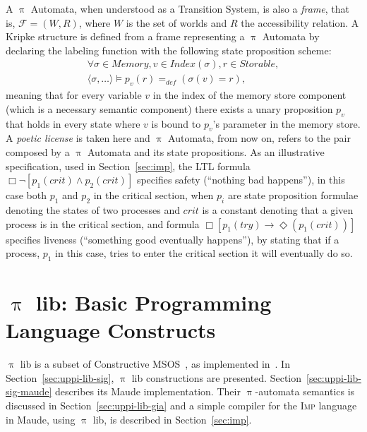\documentclass[a4paper,openany]{book}
\begin{document}
A $\uppi$ Automata, when understood as a Transition System, is also a \emph{frame}, that is, $\mathcal{F} = (W, R)$, where $W$ is the set of worlds and $R$ the accessibility relation. A Kripke structure is defined from a frame representing a $\uppi$ Automata by declaring the labeling function with the following state proposition scheme:
\begin{eqnarray}
\forall \sigma \in \mathit{Memory}, v \in \mathit{Index}(\sigma), r \in \mathit{Storable}, \nonumber\\
\langle \sigma, \ldots \rangle \models p_v(r) =_{\mathit{def}} (\sigma(v) = r),
\end{eqnarray}
meaning that for every variable $v$ in the index of the memory store component (which is a necessary semantic component) there exists a unary proposition $p_v$ that holds in every state where $v$ is bound to $p_v$'s parameter in the memory store.  A \emph{poetic license} is taken here and $\uppi$ Automata, from now on, refers to the pair composed by a $\uppi$ Automata and its state propositions.
As an illustrative specification, used in Section~\ref{sec:imp}, the LTL formula $\Box \neg[p_1(\mathit{crit}) \land p_2(\mathit{crit})]$ specifies safety (``nothing bad happens''), in this case both $p_1$ and $p_2$ in the critical section, when $p_i$ are state proposition formulae denoting the states of two processes and $\mathit{crit}$ is a constant denoting that a given process is in the critical section, and formula $\Box[p_1(\mathit{try}) \to \Diamond (p_1(\mathit{crit}))]$ specifies liveness (``something good eventually happens''),  by stating that if a process, $p_1$ in this case, tries to enter the critical section it will eventually do so.

\chapter{$\uppi$ lib: Basic Programming Language Constructs}\label{ch:uppi-lib}

$\uppi$ lib is a subset of Constructive MSOS~\cite{Mosses:2004:FCF}, as implemented in~\cite[Ch. 6]{msc-chalub}.
In Section~\ref{sec:uppi-lib-sig}, $\uppi$ lib constructions are presented. Section~\ref{sec:uppi-lib-sig-maude} describes its Maude implementation. Their $\uppi$-au\-to\-ma\-ta semantics is discussed in Section~\ref{sec:uppi-lib-gia} and a simple compiler for the \textsc{Imp} language in Maude, using $\uppi$ lib, is described in Section~\ref{sec:imp}.
\end{document}
